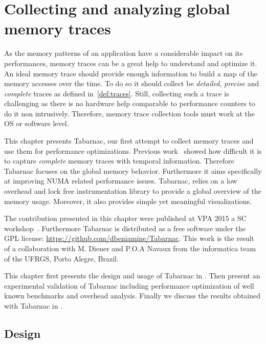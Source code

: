 \chapter{Collecting and analyzing global memory traces}

As the memory patterns of an application have a considerable impact on its performances, memory traces can be a great help to understand and optimize  it.
An ideal memory trace should provide enough information to build a map of the memory accesses over the time.
To do so it should collect be \emph{detailed}, \emph{precise} and \emph{complete} traces as defined in~\ref{def:traces}.
Still, collecting such a trace is challenging as there is no hardware help comparable to performance counters to do it non intrusively.
Therefore, memory trace collection tools must work at the \gls{OS} or software level.

This chapter presents \gls{Tabarnac}, our first attempt to collect memory traces and use them for performance optimizations.
Previous work~\cite{Beniamine13Cartographier} showed how difficult it is to capture \emph{complete} memory traces with temporal information.
Therefore \gls{Tabarnac} focuses on the global memory behavior.
Furthermore it aims specifically at improving \gls{NUMA} related performance issues.
\gls{Tabarnac}, relies on a low overhead and lock free instrumentation library to provide a global overview of the memory usage.
Moreover,  it also provides simple yet meaningful visualizations.

The contribution presented in this chapter were published at \gls{VPA} 2015 a \gls{SC} workshop~\cite{Beniamine15TABARNAC}.
Furthermore \gls{Tabarnac} is distributed as a free software under the \gls{GPL} license: \url{https://github.com/dbeniamine/Tabarnac}.
This work is the result of a collaboration with M. Diener and P.O.A Navaux from the informatica team of the \gls{UFRGS}, Porto Alegre, Brazil.

This chapter first presents the design and usage of \gls{Tabarnac} in .
Then  present an experimental validation of \gls{Tabarnac} including performance optimization of well known benchmarks and overhead analysis.
Finally we discuss the results obtained with \gls{Tabarnac} in .

\section{Design}
\label{sec:tab-design}

